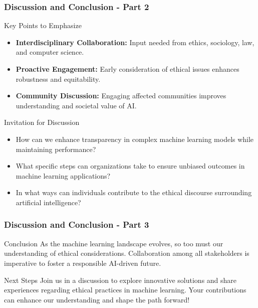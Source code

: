 \documentclass[aspectratio=169]{beamer}
\begin{document}
\begin{frame}[fragile]
    \frametitle{Discussion and Conclusion - Part 2}
    
    \begin{block}{Key Points to Emphasize}
        \begin{itemize}
            \item \textbf{Interdisciplinary Collaboration:} Input needed from ethics, sociology, law, and computer science.
            \item \textbf{Proactive Engagement:} Early consideration of ethical issues enhances robustness and equitability.
            \item \textbf{Community Discussion:} Engaging affected communities improves understanding and societal value of AI.
        \end{itemize}
    \end{block}

    \begin{block}{Invitation for Discussion}
        \begin{itemize}
            \item How can we enhance transparency in complex machine learning models while maintaining performance?
            \item What specific steps can organizations take to ensure unbiased outcomes in machine learning applications?
            \item In what ways can individuals contribute to the ethical discourse surrounding artificial intelligence?
        \end{itemize}
    \end{block}
\end{frame}

\begin{frame}[fragile]
    \frametitle{Discussion and Conclusion - Part 3}

    \begin{block}{Conclusion}
        As the machine learning landscape evolves, so too must our understanding of ethical considerations. Collaboration among all stakeholders is imperative to foster a responsible AI-driven future. 
    \end{block}
    
    \begin{block}{Next Steps}
        Join us in a discussion to explore innovative solutions and share experiences regarding ethical practices in machine learning. Your contributions can enhance our understanding and shape the path forward!
    \end{block}
\end{frame}
\end{document}

